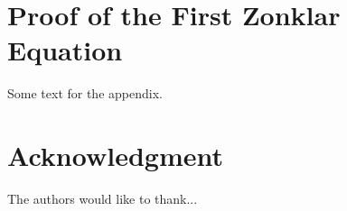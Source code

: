 \documentclass[apa6]{IEEEtran}
\begin{document}

%


\appendices
\section{Proof of the First Zonklar Equation}
Some text for the appendix.

\section*{Acknowledgment}


The authors would like to thank...


\ifCLASSOPTIONcaptionsoff
  \newpage
\fi





%
%
%


\end{document}
